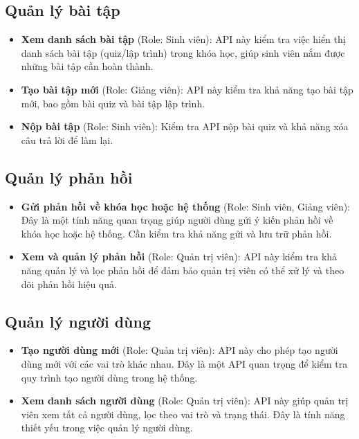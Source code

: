 \subsection{Quản lý bài tập}
\begin{itemize}
    \item \textbf{Xem danh sách bài tập} (Role: Sinh viên): API này kiểm tra việc hiển thị danh sách bài tập (quiz/lập trình) trong khóa học, giúp sinh viên nắm được những bài tập cần hoàn thành.
    \item \textbf{Tạo bài tập mới} (Role: Giảng viên): API này kiểm tra khả năng tạo bài tập mới, bao gồm bài quiz và bài tập lập trình.
    \item \textbf{Nộp bài tập} (Role: Sinh viên): Kiểm tra API nộp bài quiz và khả năng xóa câu trả lời để làm lại.
\end{itemize}

\subsection{Quản lý phản hồi}
\begin{itemize}
    \item \textbf{Gửi phản hồi về khóa học hoặc hệ thống} (Role: Sinh viên, Giảng viên): Đây là một tính năng quan trọng giúp người dùng gửi ý kiến phản hồi về khóa học hoặc hệ thống. Cần kiểm tra khả năng gửi và lưu trữ phản hồi.
    \item \textbf{Xem và quản lý phản hồi} (Role: Quản trị viên): API này kiểm tra khả năng quản lý và lọc phản hồi để đảm bảo quản trị viên có thể xử lý và theo dõi phản hồi hiệu quả.
\end{itemize}

\subsection{Quản lý người dùng}
\begin{itemize}
    \item \textbf{Tạo người dùng mới} (Role: Quản trị viên): API này cho phép tạo người dùng mới với các vai trò khác nhau. Đây là một API quan trọng để kiểm tra quy trình tạo người dùng trong hệ thống.
    \item \textbf{Xem danh sách người dùng} (Role: Quản trị viên): API này giúp quản trị viên xem tất cả người dùng, lọc theo vai trò và trạng thái. Đây là tính năng thiết yếu trong việc quản lý người dùng.
\end{itemize}
